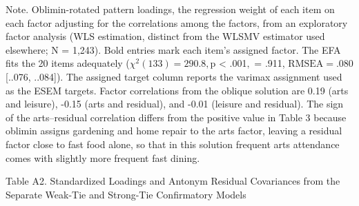 \documentclass[
  12pt
]{article}
\begin{document}
Note. Oblimin-rotated pattern loadings, the regression weight of each item on each factor adjusting for the correlations among the factors, from an exploratory factor analysis (WLS estimation, distinct from the WLSMV estimator used elsewhere; N = 1,243). Bold entries mark each item's assigned factor. The EFA fits the 20 items adequately ($\chi^2(133) = 290.8, $p < .001$, $ = .911, $\text{RMSEA} = .080$ [{..076, ..084}]). The assigned target column reports the varimax assignment used as the ESEM targets. Factor correlations from the oblique solution are 0.19 (arts and leisure), -0.15 (arts and residual), and -0.01 (leisure and residual). The sign of the arts--residual correlation differs from the positive value in Table 3 because oblimin assigns gardening and home repair to the arts factor, leaving a residual factor close to fast food alone, so that in this solution frequent arts attendance comes with slightly more frequent fast dining.


Table A2. Standardized Loadings and Antonym Residual Covariances from the Separate Weak-Tie and Strong-Tie Confirmatory Models
\end{document}
